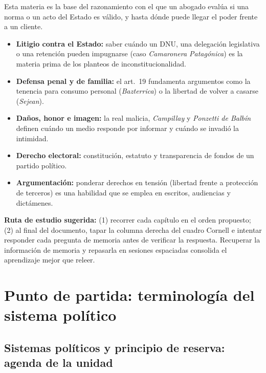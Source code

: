 \documentclass[12pt,oneside]{book}
\begin{document}
\begin{important}
Esta materia es la base del razonamiento con el que un abogado evalúa si una norma o un acto del Estado es válido, y hasta dónde puede llegar el poder frente a un cliente.

\begin{itemize}
\item \textbf{Litigio contra el Estado:} saber cuándo un DNU, una delegación legislativa o una retención pueden impugnarse (caso \emph{Camaronera Patagónica}) es la materia prima de los planteos de inconstitucionalidad.
\item \textbf{Defensa penal y de familia:} el art.\ 19 fundamenta argumentos como la tenencia para consumo personal (\emph{Bazterrica}) o la libertad de volver a casarse (\emph{Sejean}).
\item \textbf{Daños, honor e imagen:} la real malicia, \emph{Campillay} y \emph{Ponzetti de Balbín} definen cuándo un medio responde por informar y cuándo se invadió la intimidad.
\item \textbf{Derecho electoral:} constitución, estatuto y transparencia de fondos de un partido político.
\item \textbf{Argumentación:} ponderar derechos en tensión (libertad frente a protección de terceros) es una habilidad que se emplea en escritos, audiencias y dictámenes.
\end{itemize}
\end{important}

\textbf{Ruta de estudio sugerida:} (1) recorrer cada capítulo en el orden propuesto; (2) al final del documento, tapar la columna derecha del cuadro Cornell e intentar responder cada pregunta de memoria antes de verificar la respuesta. Recuperar la información de memoria y repasarla en sesiones espaciadas consolida el aprendizaje mejor que releer.

\chapter[Punto de partida]{Punto de partida: terminología del sistema político}

\section{Sistemas políticos y principio de reserva: agenda de la unidad}
\end{document}
